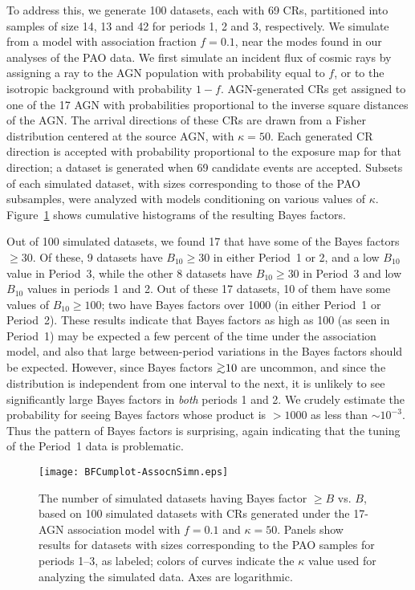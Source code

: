 To address this, we generate 100 datasets, each with 69 CRs, partitioned
into samples of size 14, 13 and 42 for periods 1, 2 and 3, respectively.  We
simulate from a model with association fraction $f=0.1$, near the modes
found in our analyses of the PAO data.  We first simulate an incident flux
of cosmic rays by assigning a ray to the AGN population with probability
equal to $f$, or to the isotropic background with probability $1-f$.
AGN-generated CRs get assigned to one of the 17 AGN with probabilities
proportional to the inverse square distances of the AGN. The arrival
directions of these CRs are drawn from a Fisher distribution centered at the
source AGN, with $\kappa = 50$.  Each generated CR direction is accepted
with probability proportional to the exposure map for that direction; a
dataset is generated when 69 candidate events are accepted.  Subsets
of each simulated dataset, with sizes corresponding to those of the
PAO subsamples, were analyzed with models conditioning on various
values of $\kappa$.  Figure~\ref{fig:assocCumBF} shows cumulative
histograms of the resulting Bayes factors.

Out of 100 simulated datasets, we found 17 that have some of the Bayes
factors $\geq 30$.  Of these, 9 datasets have $B_{10}\geq 30$ in either
Period~1 or 2, and a low $B_{10}$ value in Period~3, while the other 8
datasets have $B_{10}\geq 30$ in Period~3 and low $B_{10}$ values in periods
1 and 2.  Out of these 17 datasets, 10 of them have some values of
$B_{10}\geq 100$; two have Bayes factors over 1000 (in either Period~1
or Period~2).  
These results indicate that Bayes factors as high as 100 (as seen in Period~1)
may be expected a few percent of the time under the association model, and
also that large between-period variations in the Bayes factors should be
expected.  However, since Bayes factors $\gta 10$ are uncommon, and since the
distribution is independent from one interval to the next, it is unlikely to
see significantly large Bayes factors in {\em both} periods 1 and 2.  We
crudely estimate the probability for seeing Bayes factors whose product
is $> 1000$ as less than $\sim 10^{-3}$.  Thus the pattern of Bayes factors is
surprising, again indicating that the tuning of the Period~1 data is
problematic.

\begin{figure}
\centerline{\texttt{[image: BFCumplot-AssocnSimn.eps]}}
\caption{The number of simulated datasets having Bayes factor $\geq B$
vs. $B$, based on 100 simulated datasets with CRs generated under the
17-AGN association model with $f=0.1$ and $\kappa=50$.  Panels show
results for datasets with sizes corresponding to the PAO samples for
periods 1--3, as labeled; colors of curves indicate the $\kappa$ value
used for analyzing the simulated data.  Axes are logarithmic.}
\label{fig:assocCumBF}
\end{figure}


